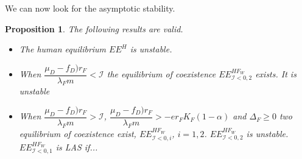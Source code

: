 \documentclass{article}
\newcommand{\lfw}{\lambda_{F}}
\newcommand{\lfw}{\lambda_{F}}
\newcommand{\cI}{\mathcal{I}}
\newtheorem{prop}{Proposition}
\begin{document}
We can now look for the asymptotic stability.

\begin{prop}
The following results are valid.
\begin{itemize}
\item The human equilibrium $EE^{H}$ is unstable.
\item When $\dfrac{\mu_D - f_D)r_F}{\lfw m} < \cI $ the equilibrium of coexistence $EE^{HF_W}_{\cI < 0, 2}$ exists. It is unstable
\item When $\dfrac{\mu_D - f_D)r_F}{\lfw m} > \cI $, 
$ \dfrac{\mu_D - f_D)r_F}{\lfw m} > - e r_F K_F(1-\alpha)$ and
$ \Delta_F  \geq 0$ two equilibrium of coexistence exist,  $EE^{HF_W}_{\cI < 0, i}$, $i=1,2$. $EE^{HF_W}_{\cI < 0, 2}$ is unstable. $EE^{HF_W}_{\cI < 0, 1}$ is LAS if...
\end{itemize}
\end{prop}
\end{document}
